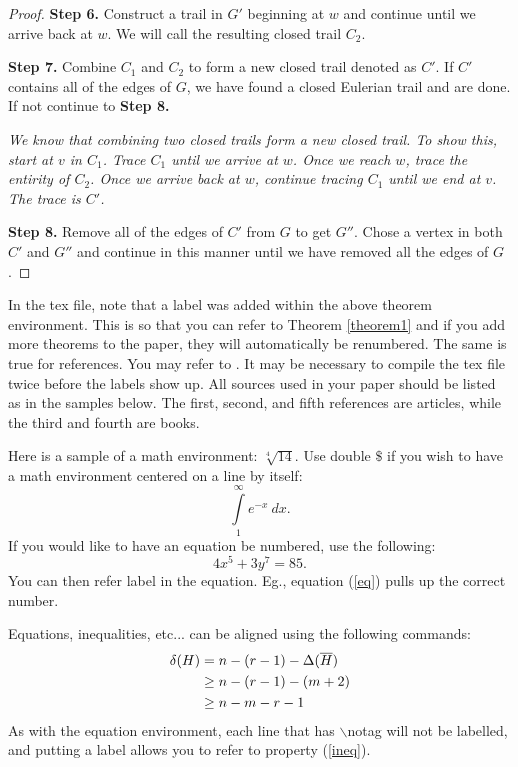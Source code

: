 \documentclass[10pt]{amsart}
\begin{document}
\begin{proof}
    \noindent
    \textbf{Step 6.} Construct a trail in $G'$ beginning at $w$ and continue until we arrive back at
    $w$. We will call the resulting closed trail $C_2$.

    \noindent
    \textbf{Step 7.} Combine $C_1$ and $C_2$ to form a new closed trail denoted as $C'$. If $C'$
    contains all of the edges of $G$, we have found a closed Eulerian trail and are done. If not 
    continue to \textbf{Step 8.}

    \noindent \emph{
        We know that combining two closed trails form a new closed trail. To show this, start at $v$
        in $C_1$. Trace $C_1$ until we arrive at $w$. Once we reach $w$, trace the entirity of $C_2$.
        Once we arrive back at $w$, continue tracing $C_1$ until we end at $v$. The trace is $C'$.
    }

    \noindent
    \textbf{Step 8.} Remove all of the edges of $C'$ from $G$ to get $G''$. Chose a vertex in both
    $C'$ and $G''$ and continue in this manner until we have removed all the edges of $G$.

    
\end{proof}

In the tex file, note that a label was added within the above theorem environment.  This is so that you can refer to Theorem \ref{theorem1} and if you add more theorems to the paper, they will automatically be renumbered.  The same is true for references.  You may refer to \cite{R}.  It may be necessary to compile the tex file twice before the labels show up.  All sources used in your paper should be listed as in the samples below.  The first, second, and fifth references are articles, while the third and fourth are books.

Here is a sample of a math environment: $\sqrt[4]{14}$.  Use double $\$$ if you wish to have a math environment centered on a line by itself:
$$\mathop{\int}\limits_{1}^{\infty} e^{-x} \ dx.$$
If you would like to have an equation be numbered, use the following:
\begin{equation}  4x^5+3y^7=85. \label{eq} \end{equation}
You can then refer label in the equation.  Eg., equation (\ref{eq}) pulls up the correct number.

Equations, inequalities, etc... can be aligned using the following commands:
\begin{align} \delta (H) &= n-(r-1)-\Delta (\overline{H}) \notag \\
                                    &\ge n-(r-1)-(m+2) \notag \\
                                    &\ge n-m-r-1 \label{ineq} \end{align}
As with the equation environment, each line that has $\backslash$notag will not be labelled, and putting a label allows you to refer to property (\ref{ineq}).
\end{document}
